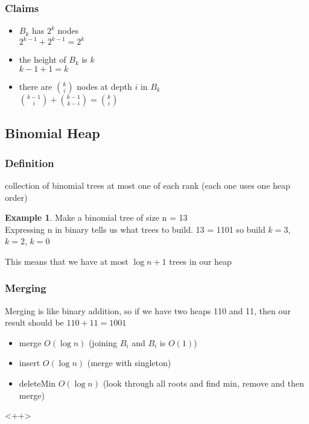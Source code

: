 \documentclass[]{article}
\theoremstyle{definition}
\newtheorem{ex}{Example}[section]
\begin{document}
	\subsubsection{Claims}
	\begin{itemize}
		\item $B_k$ has $2^k$ nodes \\
			$2^{k-1} + 2^{k-1} = 2^k$
		\item the height of $B_k$ is $k$ \\
			$k-1 + 1 = k$
		\item there are $k \choose i$ nodes at depth $i$ in $B_k$ \\
			${{k - 1} \choose i} + {{k-1} \choose {k-i}} = {k \choose i}$
	\end{itemize}
	
	\subsection{Binomial Heap}
	\subsubsection{Definition}
	collection of binomial trees at most one of each rank (each one uses one heap order)

	\begin{ex}
		Make a binomial tree of size n = 13 \\
		Expressing n in binary tells us what trees to build. 13 = 1101 so build $k=3$, $k=2$, $k=0$
	\end{ex}

	This means that we have at most $\log n + 1$ trees in our heap

	\subsubsection{Merging}
	Merging is like binary addition, so if we have two heaps 110 and 11, then our result should be $110 + 11 = 1001$
	\begin{itemize}
		\item merge $O(\log n)$ (joining $B_i$ and $B_i$ is $O(1)$)
		\item insert $O(\log n)$ (merge with singleton)
		\item deleteMin $O(\log n)$ (look through all roots and find min, remove and then merge)
	\end{itemize}<++>
\end{document}
